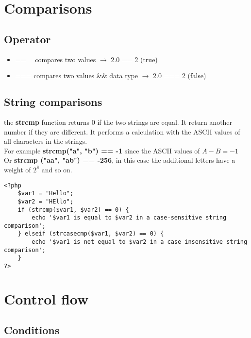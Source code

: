\documentclass[a4paper]{article}
\begin{document}
\pagebreak

\section{Comparisons}

\subsection{Operator}

\begin{itemize}
    \item == \ \ compares two values \(\rightarrow\) 2.0 == 2 (true)
    \item === compares two values \&\& data type \(\rightarrow\)  2.0 === 2 (false)
\end{itemize}

\subsection{String comparisons}

the \textbf{strcmp} function returns \(0\) if the two strings are equal.
It return another number if they are different. It performs a calculation with the ASCII values of all characters in the strings.
\\
For example \textbf{strcmp("a", "b") == -1} since the ASCII values of \(A-B = -1\) \\ 
Or \textbf{strcmp ("aa", "ab") == -256}, in this case the additional letters have a weight of \(2 ^ 8 \) and so on. 

\begin{lstlisting}
<?php
    $var1 = "Hello";
    $var2 = "HEllo";
    if (strcmp($var1, $var2) == 0) {
        echo '$var1 is equal to $var2 in a case-sensitive string comparison';
    } elseif (strcasecmp($var1, $var2) == 0) {
        echo '$var1 is not equal to $var2 in a case insensitive string comparison';
    }
?>
\end{lstlisting}

\pagebreak

\section{Control flow}

\subsection{Conditions}
\end{document}
